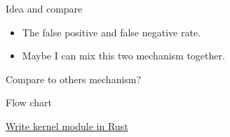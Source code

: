 \documentclass{beamer}
\begin{document}
\begin{CJK*}{UTF8}{bsmi}
  \begin{frame}{Idea and compare}

    \begin{itemize}
      \item The false positive and false negative rate.
      \item Maybe I can mix this two mechanism together.
    \end{itemize}
    Compare to others mechanism?
  \end{frame}

  \begin{frame}{Flow chart}
    \centering
    \scalebox{0.9} {
    }
  \end{frame}

  {
  \begin{frame}[plain]
    \centering
    \href{https://min.news/en/tech/6a15a93324c35f2e4c26213dfe04431d.html?__cf_chl_jschl_tk__=pmd_fae7f5a25085221cdd53313705eb12bc13a31bb7-1627020947-0-gqNtZGzNAk2jcnBszQai}
    {Write kernel module in Rust}
  \end{frame}
  }


\end{CJK*}
\end{document}
